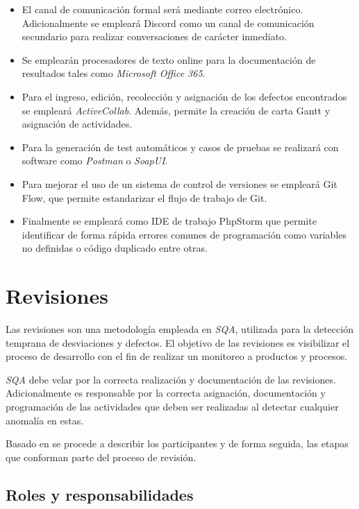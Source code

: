 \begin{itemize}
	\item 
		El canal de comunicación formal será mediante correo electrónico. Adicionalmente se empleará Discord como un canal de comunicación secundario para realizar conversaciones de carácter inmediato.
	\item
		Se emplearán procesadores de texto online para la documentación de resultados tales como \textit{Microsoft Office 365}.
	\item
		Para el ingreso, edición, recolección y asignación de los defectos encontrados se empleará \textit{ActiveCollab}. Además, permite la creación de carta Gantt y asignación de actividades.
	\item
		Para la generación de test automáticos y casos de pruebas se realizará con software como \textit{Postman} o \textit{SoapUI}.
	\item 
		Para mejorar el uso de un sistema de control de versiones se empleará Git Flow, que permite estandarizar el flujo de trabajo de Git.
	\item
		Finalmente se empleará como IDE de trabajo PhpStorm que permite identificar de forma rápida errores comunes de programación como variables no definidas o código duplicado entre otras.
\end{itemize}

\section{Revisiones}

Las revisiones son una metodología empleada en \textit{SQA}, utilizada para la detección temprana de desviaciones y defectos. El objetivo de las revisiones es visibilizar el proceso de desarrollo con el fin de realizar un monitoreo a productos y procesos.

\textit{SQA} debe velar por la correcta realización y documentación de las revisiones. Adicionalmente es responsable por la correcta asignación, documentación y programación de las actividades que deben ser realizadas al detectar cualquier anomalía en estas.

Basado en \citet{web00} se procede a describir los participantes y de forma seguida, las etapas que conforman parte del proceso de revisión. 

\subsection{Roles y responsabilidades}

